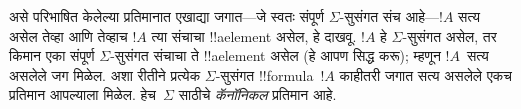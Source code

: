 \documentclass[../../../include/open-logic-section]{subfiles}
\begin{document}
असे परिभाषित केलेल्या प्रतिमानात एखाद्या
जगात---जे स्वतः संपूर्ण $\Sigma$-सुसंगत
संच आहे---$!A$ सत्य असेल तेव्हा आणि
तेव्हाच $!A$ त्या संचाचा !!a{element}
असेल, हे दाखवू. $!A$ हे
$\Sigma$-सुसंगत असेल, तर किमान एका
संपूर्ण $\Sigma$-सुसंगत संचाचा ते
!!a{element} असेल (हे आपण सिद्ध करू);
म्हणून $!A$~सत्य असलेले जग मिळेल. अशा
रीतीने प्रत्येक $\Sigma$-सुसंगत
!!{formula}~$!A$ काहीतरी जगात सत्य असलेले
एकच प्रतिमान आपल्याला मिळेल.
हेच~$\Sigma$ साठीचे \emph{कॅनॉनिकल}
प्रतिमान आहे.
\end{document}
